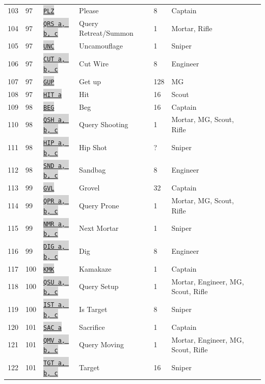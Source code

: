 \documentclass{article}
\newcommand{\vnscode}[1]{\colorbox{lightgray}{\lstinline[language=vns]{#1}}}
\begin{document}
\begin{longtable}{lllllll}
    103 & 97 & \hyperref[table:resource]{\vnscode{PLZ}} & Please & 8 & Captain \\
    104 & 97 & \hyperref[table:combat]{\vnscode{QRS a, b, c}} & Query Retreat/Summon & 1 & Mortar, Rifle \\
    105 & 97 & \hyperref[table:sniper]{\vnscode{UNC}} & Uncamouflage & 1 & Sniper \\
    106 & 97 & \hyperref[table:combat]{\vnscode{CUT a, b, c}} & Cut Wire & 8 & Engineer \\
    107 & 97 & \hyperref[table:combat]{\vnscode{GUP}} & Get up & 128 & MG \\
    108 & 97 & \hyperref[table:combat]{\vnscode{HIT a}} & Hit & 16 & Scout \\
    109 & 98 & \hyperref[table:resource]{\vnscode{BEG}} & Beg & 16 & Captain \\
    110 & 98 & \hyperref[table:combat]{\vnscode{QSH a, b, c}} & Query Shooting & 1 & Mortar, MG, Scout, Rifle \\
    111 & 98 & \hyperref[table:combat]{\vnscode{HIP a, b, c}} & Hip Shot & ? & Sniper \\
    112 & 98 & \hyperref[table:combat]{\vnscode{SND a, b, c}} & Sandbag & 8 & Engineer \\
    113 & 99 & \hyperref[table:resource]{\vnscode{GVL}} & Grovel & 32 & Captain \\
    114 & 99 & \hyperref[table:combat]{\vnscode{QPR a, b, c}} & Query Prone & 1 & Mortar, MG, Scout, Rifle \\
    115 & 99 & \hyperref[table:sniper]{\vnscode{NMR a, b, c}} & Next Mortar & 1 & Sniper \\
    116 & 99 & \hyperref[table:combat]{\vnscode{DIG a, b, c}} & Dig & 8 & Engineer \\
    117 & 100 & \hyperref[table:resource]{\vnscode{KMK}} & Kamakaze & 1 & Captain \\
    118 & 100 & \hyperref[table:combat]{\vnscode{QSU a, b, c}} & Query Setup & 1 & Mortar, Engineer, MG, Scout, Rifle \\
    119 & 100 & \hyperref[table:sniper]{\vnscode{IST a, b, c}} & Is Target & 8 & Sniper \\
    120 & 101 & \hyperref[table:resource]{\vnscode{SAC a}} & Sacrifice & 1 & Captain \\
    121 & 101 & \hyperref[table:combat]{\vnscode{QMV a, b, c}} & Query Moving & 1 & Mortar, Engineer, MG, Scout, Rifle \\
    122 & 101 & \hyperref[table:sniper]{\vnscode{TGT a, b, c}} & Target & 16 & Sniper \\

\end{longtable}
\end{document}
